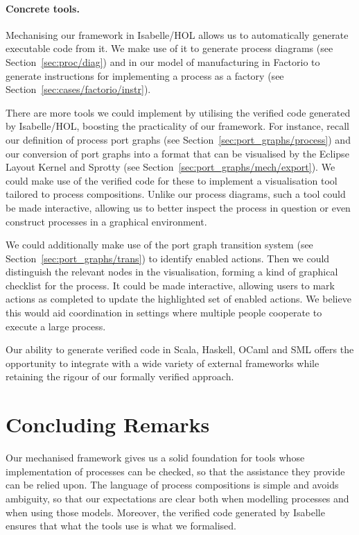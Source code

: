 \documentclass[class=smolathesis,crop=false]{standalone}
\begin{document}
\paragraph*{Concrete tools.}
Mechanising our framework in Isabelle/HOL allows us to automatically generate executable code from it.
We make use of it to generate process diagrams (see Section~\ref{sec:proc/diag}) and in our model of manufacturing in Factorio to generate instructions for implementing a process as a factory (see Section~\ref{sec:cases/factorio/instr}).

There are more tools we could implement by utilising the verified code generated by Isabelle/HOL, boosting the practicality of our framework.
For instance, recall our definition of process port graphs (see Section~\ref{sec:port_graphs/process}) and our conversion of port graphs into a format that can be visualised by the Eclipse Layout Kernel and Sprotty (see Section~\ref{sec:port_graphs/mech/export}).
We could make use of the verified code for these to implement a visualisation tool tailored to process compositions.
Unlike our process diagrams, such a tool could be made interactive, allowing us to better inspect the process in question or even construct processes in a graphical environment.

We could additionally make use of the port graph transition system (see Section~\ref{sec:port_graphs/trans}) to identify enabled actions.
Then we could distinguish the relevant nodes in the visualisation, forming a kind of graphical checklist for the process.
It could be made interactive, allowing users to mark actions as completed to update the highlighted set of enabled actions.
We believe this would aid coordination in settings where multiple people cooperate to execute a large process.

Our ability to generate verified code in Scala, Haskell, OCaml and SML offers the opportunity to integrate with a wide variety of external frameworks while retaining the rigour of our formally verified approach.

\section{Concluding Remarks}
\label{sec:conc/remarks}

Our mechanised framework gives us a solid foundation for tools whose implementation of processes can be checked, so that the assistance they provide can be relied upon.
The language of process compositions is simple and avoids ambiguity, so that our expectations are clear both when modelling processes and when using those models.
Moreover, the verified code generated by Isabelle ensures that what the tools use is what we formalised.
\end{document}
